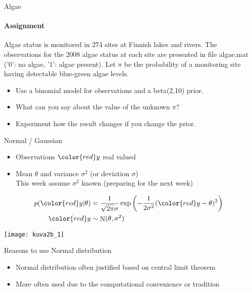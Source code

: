 \documentclass[english,t]{beamer}
\renewcommand{\emph}[1]{\textcolor{navyblue}{#1}}
\DeclareMathOperator{\N}{N}
\begin{document}
\begin{frame}{Algae}
  \framesubtitle{Assignment}

Algae status is monitored in 274 sites at Finnish lakes and rivers. 
The observations for the 2008 algae status at each site are presented
in file \emph{algae.mat} ('0': no algae, '1': algae present). 
Let $\pi$ be the probability of a monitoring site having detectable
blue-green algae levels. 

\begin{itemize}
\item Use a binomial model for observations and a \emph{beta}(2,10) prior.
\item What can you say about the value of the unknown $\pi$?
\item Experiment how the result changes if you change the prior.
\end{itemize}

\end{frame}


\begin{frame}{Normal / Gaussian}

  \begin{itemize}
  \item Observations ${\color{red}y}$ real valued
  \item Mean $\theta$ and variance $\sigma^2$ (or deviation $\sigma$)\\
    This week assume $\sigma^2$ known (preparing for the next week)
  \end{itemize}
  \vskip -2mm
  \begin{align*}
    p({\color{red}y}|\theta)&=\frac{1}{\sqrt{2\pi}\sigma}\exp\left(-\frac{1}{2\sigma^2}({\color{red}y}-\theta)^2\right)\\
    {\color{red}y} & \sim \N(\theta,\sigma^2)
  \end{align*}

  \begin{center}
      \texttt{[image: kuva2b\_1]}
  \end{center}
\end{frame}

\begin{frame}
{Reasons to use Normal distribution}

  \begin{itemize}
  \item Normal distribution often justified based on central limit theorem
  \item More often used due to the computational convenience or tradition
  \end{itemize}

\end{frame}
\end{document}
